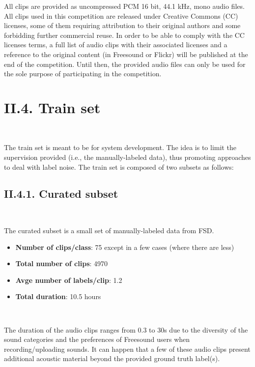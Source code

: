 \documentclass[11pt, a4papper]{report}
\theoremstyle{plain}
\theoremstyle{definition}
\theoremstyle{definition}
\theoremstyle{proposition}
\begin{document}
All clips are provided as uncompressed PCM 16 bit, 44.1 kHz, mono audio files. All clips used in this competition are released under Creative Commons (CC) licenses, some of them requiring attribution to their original authors and some forbidding further commercial reuse. In order to be able to comply with the CC licenses terms, a full list of audio clips with their associated licenses and a reference to the original content (in Freesound or Flickr) will be published at the end of the competition. Until then, the provided audio files can only be used for the sole purpose of participating in the competition.
\\

\section*{II.4. Train set}
\

The train set is meant to be for system development. The idea is to limit the supervision provided (i.e., the manually-labeled data), thus promoting approaches to deal with label noise. The train set is composed of two subsets as follows:

\subsection*{II.4.1. Curated subset}
\

The curated subset is a small set of manually-labeled data from FSD.
\begin{itemize}
\item \textbf{Number of clips/class}: 75 except in a few cases (where there are less)
\item \textbf{Total number of clips}: 4970
\item \textbf{Avge number of labels/clip}: 1.2
\item \textbf{Total duration}: 10.5 hours
\end{itemize}
\

The duration of the audio clips ranges from 0.3 to 30s due to the diversity of the sound categories and the preferences of Freesound users when recording/uploading sounds. It can happen that a few of these audio clips present additional acoustic material beyond the provided ground truth label(s).
\end{document}
